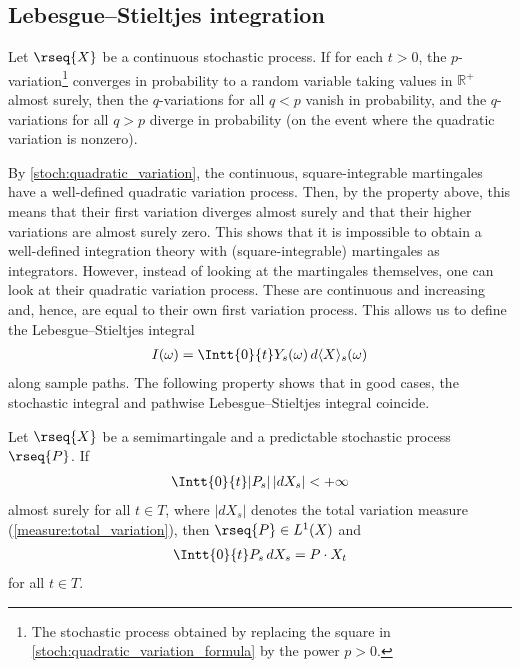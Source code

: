 \subsection{Lebesgue--Stieltjes integration}

    \begin{property}
        Let $\rseq{X}$ be a continuous stochastic process. If for each $t>0$, the $p$-variation\footnote{The stochastic process obtained by replacing the square in \cref{stoch:quadratic_variation_formula} by the power $p>0$.} converges in probability to a random variable taking values in $\mathbb{R}^+$ almost surely, then the $q$-variations for all $q<p$ vanish in probability, and the $q$-variations for all $q>p$ diverge in probability (on the event where the quadratic variation is nonzero).
    \end{property}
    By \cref{stoch:quadratic_variation}, the continuous, square-integrable martingales have a well-defined quadratic variation process. Then, by the property above, this means that their first variation diverges almost surely and that their higher variations are almost surely zero. This shows that it is impossible to obtain a well-defined integration theory with (square-integrable) martingales as integrators. However, instead of looking at the martingales themselves, one can look at their quadratic variation process. These are continuous and increasing and, hence, are equal to their own first variation process. This allows us to define the Lebesgue--Stieltjes integral
    \begin{gather}
        I(\omega) = \Intt{0}{t} Y_s(\omega)\,d\langle X \rangle_s(\omega)
    \end{gather}
    along sample paths. The following property shows that in good cases, the stochastic integral and pathwise Lebesgue--Stieltjes integral coincide.
    \begin{property}
        Let $\rseq{X}$ be a semimartingale and a predictable stochastic process $\rseq{P}$. If
        \begin{gather}
            \Intt{0}{t}|P_s|\,|dX_s| < +\infty
        \end{gather}
        almost surely for all $t\in T$, where $|dX_s|$ denotes the total variation measure (\cref{measure:total_variation}), then $\rseq{P}\in L^1(X)$ and
        \begin{gather}
            \Intt{0}{t}P_s\,dX_s = P\cdot X_t
        \end{gather}
        for all $t\in T$.
    \end{property}

